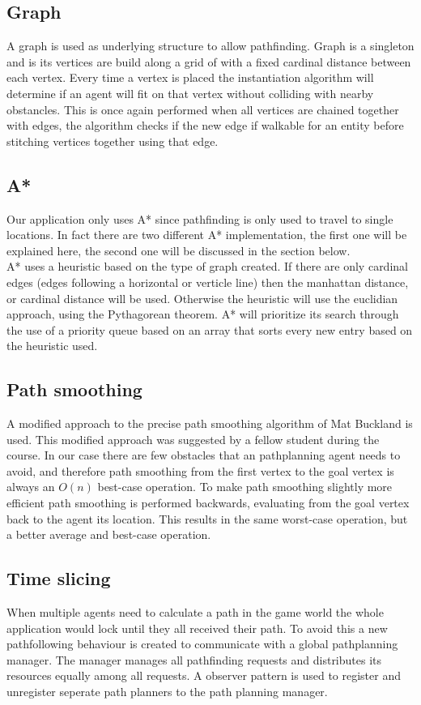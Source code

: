\documentclass{article}
\begin{document}
   \subsection {Graph}
  A graph is used as underlying structure to allow pathfinding. Graph is a singleton and is its vertices are build along a grid of with a fixed cardinal distance between each vertex. Every time a vertex is placed the instantiation algorithm will determine if an agent will fit on that vertex without colliding with nearby obstancles. This is once again performed when all vertices are chained together with edges, the algorithm checks if the new edge if walkable for an entity before stitching vertices together using that edge.
   \subsection {A*}
  Our application only uses A* since pathfinding is only used to travel to single locations. In fact there are two different A* implementation, the first one will be explained here, the second one will be discussed in the section below. \\
  A* uses a heuristic based on the type of graph created. If there are only cardinal edges (edges following a horizontal or verticle line) then the manhattan distance, or cardinal distance will be used. Otherwise the heuristic will use the euclidian approach, using the Pythagorean theorem. A* will prioritize its search through the use of a priority queue based on an array that sorts every new entry based on the heuristic used. 
   \subsection {Path smoothing}
A modified approach to the precise path smoothing algorithm of Mat Buckland \cite{pgaie} is used. This modified approach was suggested by a fellow student during the course. In our case there are few obstacles that an pathplanning agent needs to avoid, and therefore path smoothing from the first vertex to the goal vertex is always an \(O(n)\) best-case operation. To make path smoothing slightly more efficient path smoothing is performed backwards, evaluating from the goal vertex back to the agent its location. This results in the same worst-case operation, but a better average and best-case operation.
   \subsection {Time slicing}
  When multiple agents need to calculate a path in the game world the whole application would lock until they all received their path. To avoid this a new pathfollowing behaviour is created to communicate with a global pathplanning manager. The manager manages all pathfinding requests and distributes its resources equally among all requests. A observer pattern is used to register and unregister seperate path planners to the path planning manager.
   
\end{document}
